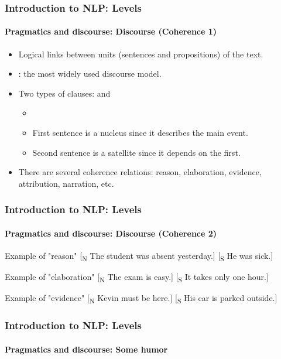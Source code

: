 \documentclass[xcolor=table]{beamer}
\begin{document}
\begin{frame}
\frametitle{Introduction to NLP: Levels}
\framesubtitle{Pragmatics and discourse: Discourse (Coherence 1)}

\begin{itemize}
	\item Logical links between units (sentences and propositions) of the text.
	\item {}: the most widely used discourse model.
	\item Two types of clauses:  and 
	\begin{itemize}
		\item {}
		\item First sentence is a nucleus since it describes the main event.
		\item Second sentence is a satellite since it depends on the first.
	\end{itemize}
	\item There are several coherence relations: reason, elaboration, evidence, attribution, narration, etc.
\end{itemize}

\end{frame}

\begin{frame}
\frametitle{Introduction to NLP: Levels}
\framesubtitle{Pragmatics and discourse: Discourse (Coherence 2)}

\begin{exampleblock}{Example of "reason"}
	[\textsubscript{N} The student was absent yesterday.] [\textsubscript{S} He was sick.]
\end{exampleblock}

\begin{exampleblock}{Example of "elaboration"}
	[\textsubscript{N} The exam is easy.] [\textsubscript{S} It takes only one hour.]
\end{exampleblock}

\begin{exampleblock}{Example of "evidence"}
	[\textsubscript{N} Kevin must be here.] [\textsubscript{S} His car is parked outside.]
\end{exampleblock}

\end{frame}

\begin{frame}
\frametitle{Introduction to NLP: Levels}
\framesubtitle{Pragmatics and discourse: Some humor}

\begin{center}
\end{center}

\end{frame}
\end{document}
